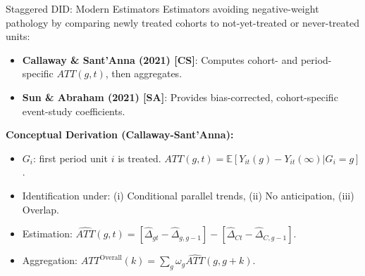 \documentclass{beamer}
\begin{document}
\begin{frame}{Staggered DID: Modern Estimators}
  Estimators avoiding negative-weight pathology by comparing newly treated cohorts to not-yet-treated or never-treated units:
  \begin{itemize}
    \item \textbf{Callaway \& Sant'Anna (2021) [CS]}: Computes cohort- and period-specific $ATT(g,t)$, then aggregates.
    \item \textbf{Sun \& Abraham (2021) [SA]}: Provides bias-corrected, cohort-specific event-study coefficients.
  \end{itemize}
  \textbf{Conceptual Derivation (Callaway-Sant'Anna):}
  \begin{itemize}
    \item $G_i$: first period unit $i$ is treated. $ATT(g,t) = \mathbb{E}[Y_{it}(g)-Y_{it}(\infty) | G_i=g]$.
    \item Identification under: (i) Conditional parallel trends, (ii) No anticipation, (iii) Overlap.
    \item Estimation: $\widehat{ATT}(g,t) = [\hat{\Delta}_{gt}-\hat{\Delta}_{g,g-1}] - [\hat{\Delta}_{Ct}-\hat{\Delta}_{C,g-1}]$.
    \item Aggregation: $ATT^{\text{Overall}}(k) = \sum_{g} \omega_g \widehat{ATT}(g,g+k)$.
  \end{itemize}
\end{frame}
\end{document}
